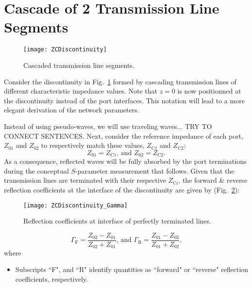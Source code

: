 \section{Cascade of 2 Transmission Line Segments}
\begin{figure}[!ht]
	\centering
	\texttt{[image: ZCDiscontinuity]}
	\caption{Cascaded transmission line segments.}
\label{fig:ZCDiscontinuity}%
\end{figure}
%
\par Consider the discontinuity in Fig.~\ref{fig:ZCDiscontinuity} formed by cascading transmission lines of different characteristic impedance values. Note that $z=0$ is now positionned at the discontinuity instead of the port interfaces. This notation will lead to a more elegant derivation of the network parameters.
%
\par Instead of using pseudo-waves, we will use traveling waves... TRY TO CONNECT SENTENCES. Next, consider the reference impedance of each port, $Z_\mathrm{01}$ and $Z_\mathrm{02}$ to respectively match these values, $Z_\mathrm{C1}$ and $Z_\mathrm{C2}$:
\begin{equation}
	Z_\mathrm{01}=Z_\mathrm{C1}
	\textrm{, and }
	Z_\mathrm{02}=Z_\mathrm{C2}
\label{eq:CascadedLines_Z0eqZC}%
	\textrm{.}
\end{equation}
%
As a consequence, reflected waves will be fully absorbed by the port terminations during the conceptual $S$-parameter measurement that follows.  Given that the transmission lines are terminated with their respective $Z_{\mathrm{C}i}$, the forward \& reverse reflection coefficients at the interface of the discontinuity are given by (Fig.~\ref{fig:ZCDiscontinuity_Gamma}):
\begin{figure}[!ht]
	\centering
	\texttt{[image: ZCDiscontinuity\_Gamma]}
	\caption{Reflection coefficients at interface of perfectly terminated lines.}
\label{fig:ZCDiscontinuity_Gamma}%
\end{figure}
%
\begin{equation}
	\Gamma_\mathrm{F}= \frac{Z_\mathrm{02}-Z_\mathrm{01}}{Z_\mathrm{02}+Z_\mathrm{01}}
	\textrm{, and }
	\Gamma_\mathrm{R}= \frac{Z_\mathrm{01}-Z_\mathrm{02}}{Z_\mathrm{01}+Z_\mathrm{02}}
	\textrm{.}
\end{equation}
%
where
\begin{itemize}%
	\item[]Subscripts ``F", and ``R" identify quantities as ``forward" or ``reverse" reflection coefficients, respectively.
\end{itemize}
%
